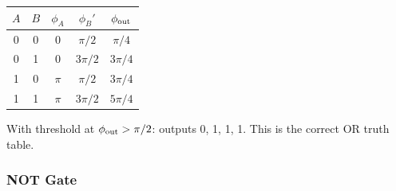 \documentclass[aps,prd,twocolumn,superscriptaddress,nofootinbib,floatfix]{revtex4-2}
\begin{document}
\begin{center}
\begin{tabular}{cc|cc|c}
$A$ & $B$ & $\phi_A$ & $\phi_B'$ & $\phi_{\rm out}$ \\
\hline
0 & 0 & 0 & $\pi/2$ & $\pi/4$ \\
0 & 1 & 0 & $3\pi/2$ & $3\pi/4$ \\
1 & 0 & $\pi$ & $\pi/2$ & $3\pi/4$ \\
1 & 1 & $\pi$ & $3\pi/2$ & $5\pi/4$ \\
\end{tabular}
\end{center}

With threshold at $\phi_{\rm out} > \pi/2$: outputs 0, 1, 1, 1.
This is the correct OR truth table.

\subsubsection{NOT Gate}
\end{document}
